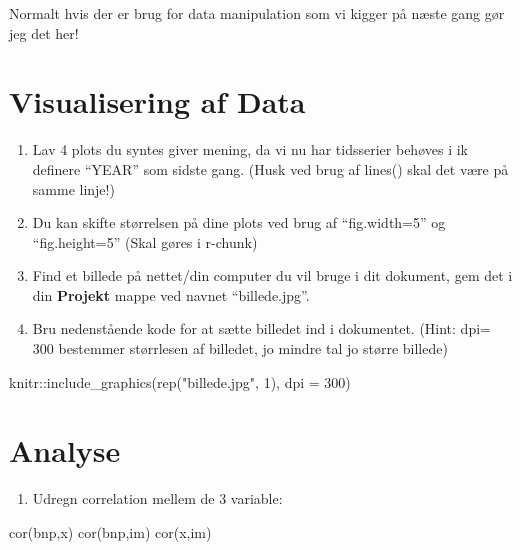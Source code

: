 \documentclass[
  12pt,
]{article}
\newenvironment{Shaded}{\begin{snugshade}}{\end{snugshade}}
\newcommand{\AttributeTok}[1]{\textcolor[rgb]{0.77,0.63,0.00}{#1}}
\newcommand{\DecValTok}[1]{\textcolor[rgb]{0.00,0.00,0.81}{#1}}
\newcommand{\FunctionTok}[1]{\textcolor[rgb]{0.00,0.00,0.00}{#1}}
\newcommand{\NormalTok}[1]{#1}
\newcommand{\SpecialCharTok}[1]{\textcolor[rgb]{0.00,0.00,0.00}{#1}}
\newcommand{\StringTok}[1]{\textcolor[rgb]{0.31,0.60,0.02}{#1}}
\providecommand{\tightlist}{%
  \setlength{\itemsep}{0pt}\setlength{\parskip}{0pt}}
\begin{document}
Normalt hvis der er brug for data manipulation som vi kigger på næste
gang gør jeg det her!

\hypertarget{visualisering-af-data}{%
\section{Visualisering af Data}\label{visualisering-af-data}}

\begin{enumerate}
\def\labelenumi{\arabic{enumi}.}
\item
  Lav 4 plots du syntes giver mening, da vi nu har tidsserier behøves i
  ik definere ``YEAR'' som sidste gang. (Husk ved brug af lines() skal
  det være på samme linje!)
\item
  Du kan skifte størrelsen på dine plots ved brug af ``fig.width=5'' og
  ``fig.height=5'' (Skal gøres i r-chunk)
\item
  Find et billede på nettet/din computer du vil bruge i dit dokument,
  gem det i din \textbf{Projekt} mappe ved navnet ``billede.jpg''.
\item
  Bru nedenstående kode for at sætte billedet ind i dokumentet. (Hint:
  dpi= 300 bestemmer størrlesen af billedet, jo mindre tal jo større
  billede)
\end{enumerate}

\begin{Shaded}
\begin{Highlighting}[]
\NormalTok{knitr}\SpecialCharTok{::}\FunctionTok{include\_graphics}\NormalTok{(}\FunctionTok{rep}\NormalTok{(}\StringTok{"billede.jpg"}\NormalTok{, }\DecValTok{1}\NormalTok{), }\AttributeTok{dpi =} \DecValTok{300}\NormalTok{)}
\end{Highlighting}
\end{Shaded}

\hypertarget{analyse}{%
\section{Analyse}\label{analyse}}

\begin{enumerate}
\def\labelenumi{\arabic{enumi}.}
\tightlist
\item
  Udregn correlation mellem de 3 variable:
\end{enumerate}

\begin{Shaded}
\begin{Highlighting}[]
\FunctionTok{cor}\NormalTok{(bnp,x)}
\FunctionTok{cor}\NormalTok{(bnp,im)}
\FunctionTok{cor}\NormalTok{(x,im)}
\end{Highlighting}
\end{Shaded}
\end{document}
